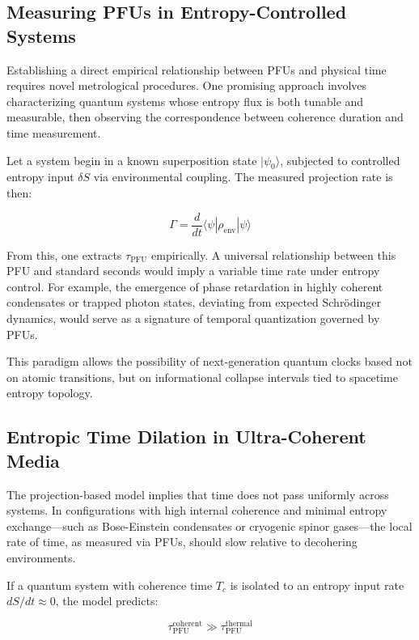 \documentclass[12pt,a4paper]{article}
\numberwithin{equation}{section}
\begin{document}
\subsection{Measuring PFUs in Entropy-Controlled Systems}

Establishing a direct empirical relationship between PFUs and physical time requires novel metrological procedures. One promising approach involves characterizing quantum systems whose entropy flux is both tunable and measurable, then observing the correspondence between coherence duration and time measurement.

Let a system begin in a known superposition state \(|\psi_0\rangle\), subjected to controlled entropy input \(\delta S\) via environmental coupling. The measured projection rate is then:

\begin{equation}
\Gamma = \frac{d}{dt} \langle \psi | \rho_{\text{env}} | \psi \rangle
\label{eq:decoherence_rate}
\end{equation}

From this, one extracts \(\tau_{\text{PFU}}\) empirically. A universal relationship between this PFU and standard seconds would imply a variable time rate under entropy control. For example, the emergence of phase retardation in highly coherent condensates or trapped photon states, deviating from expected Schrödinger dynamics, would serve as a signature of temporal quantization governed by PFUs.

This paradigm allows the possibility of next-generation quantum clocks based not on atomic transitions, but on informational collapse intervals tied to spacetime entropy topology.

\subsection{Entropic Time Dilation in Ultra-Coherent Media}

The projection-based model implies that time does not pass uniformly across systems. In configurations with high internal coherence and minimal entropy exchange—such as Bose-Einstein condensates or cryogenic spinor gases—the local rate of time, as measured via PFUs, should slow relative to decohering environments.

If a quantum system with coherence time \(T_c\) is isolated to an entropy input rate \(dS/dt \approx 0\), the model predicts:

\begin{equation}
\tau_{\text{PFU}}^{\text{coherent}} \gg \tau_{\text{PFU}}^{\text{thermal}}
\label{eq:entropic_dilation}
\end{equation}
\end{document}
